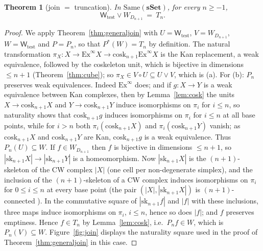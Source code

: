 \documentclass[11pt]{amsart}
\newtheorem{thm}{Theorem}[section]
\theoremstyle{definition}
\newcommand{\Same}{\mathrm{Same}}
\newcommand{\cosk}{\mathrm{cosk}}
\newcommand{\sk}{\mathrm{sk}}
\newcommand{\Wtest}{\mathsf{W}_{\mathrm{test}}}
\newcommand{\sset}{\mathbf{sSet}}
\begin{document}
\begin{thm}[join $=$ truncation]\label{thm:join}
In $\Same(\sset)$, for every $n\ge-1$,
\[
\Wtest\vee W_{D_{n+1}}\ =\ T_n .
\]
\end{thm}
\begin{proof}
We apply Theorem~\ref{thm:generaljoin} with $U=\Wtest$, $V=W_{D_{n+1}}$,
$W=\Wtest$ and $P=P_n$, so that $P^*(W)=T_n$ by definition. The natural
transformation $\pi_X\colon X\to\mathrm{Ex}^\infty X\to\cosk_{n+1}\mathrm{Ex}^\infty X$
is the Kan replacement, a weak equivalence, followed by the coskeleton unit,
which is bijective in dimensions $\le n+1$ (Theorem~\ref{thm:cube}); so
$\pi_X\in V\circ U\subseteq U\vee V$, which is (a). For (b): $P_n$ preserves
weak equivalences. Indeed $\mathrm{Ex}^\infty$ does; and if $g\colon X\to Y$ is
a weak equivalence between Kan complexes, then by Lemma~\ref{lem:cosk} the
units $X\to\cosk_{n+1}X$ and $Y\to\cosk_{n+1}Y$ induce isomorphisms on
$\pi_i$ for $i\le n$, so naturality shows that $\cosk_{n+1}g$ induces
isomorphisms on $\pi_i$ for $i\le n$ at all base points, while for $i>n$
both $\pi_i(\cosk_{n+1}X)$ and $\pi_i(\cosk_{n+1}Y)$ vanish; as
$\cosk_{n+1}X$ and $\cosk_{n+1}Y$ are Kan, $\cosk_{n+1}g$ is a weak
equivalence. Thus $P_n(U)\subseteq W$. If $f\in W_{D_{n+1}}$ then $f$ is
bijective in dimensions $\le n+1$, so $|\sk_{n+1}X|\to|\sk_{n+1}Y|$ is a
homeomorphism. Now $|\sk_{n+1}X|$ is the $(n{+}1)$-skeleton of the CW complex
$|X|$ (one cell per non-degenerate simplex), and the inclusion of the
$(n{+}1)$-skeleton of a CW complex induces isomorphisms on $\pi_i$ for
$0\le i\le n$ at every base point (the pair $(|X|,|\sk_{n+1}X|)$ is
$(n{+}1)$-connected \cite[Cor.~4.12]{Hatcher}). In the commutative square of
$|\sk_{n+1}f|$ and $|f|$ with these inclusions, three maps induce
isomorphisms on $\pi_i$, $i\le n$, hence so does $|f|$; and $f$ preserves
emptiness. Hence $f\in T_n$ by Lemma~\ref{lem:cosk}, i.e.\ $P_nf\in W$,
which is $P_n(V)\subseteq W$. Figure~\ref{fig:join} displays the naturality square used in the proof of
Theorem~\ref{thm:generaljoin} in this case.
\end{proof}
\end{document}
